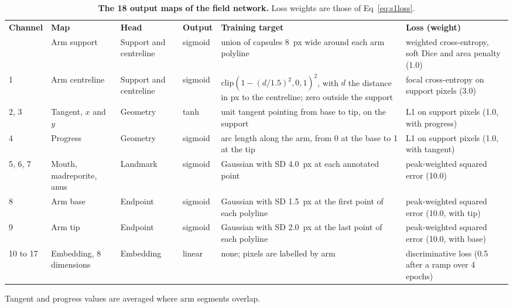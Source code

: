 \begin{table}[!htbp]
\centering
\caption{\textbf{The 18 output maps of the field network.} Loss weights are those of Eq~\ref{eq:s1loss}.}
\label{tab:fields}
{\footnotesize
\setlength{\tabcolsep}{3.5pt}
\begin{tabular}{|l|>{\raggedright\arraybackslash}p{0.9in}|>{\raggedright\arraybackslash}p{0.75in}|l|>{\raggedright\arraybackslash}p{2.0in}|>{\raggedright\arraybackslash}p{1.25in}|}
\hline
\textbf{Channel} & \textbf{Map} & \textbf{Head} & \textbf{Output} & \textbf{Training target} & \textbf{Loss (weight)} \\ \thickhline
0 & Arm support & Support and centreline & sigmoid & union of capsules 8~px wide around each arm polyline & weighted cross-entropy, soft Dice and area penalty (1.0) \\ \hline
1 & Arm centreline & Support and centreline & sigmoid & $\mathrm{clip}(1 - (d/1.5)^2, 0, 1)^2$, with $d$ the distance in px to the centreline; zero outside the support & focal cross-entropy on support pixels (3.0) \\ \hline
2, 3 & Tangent, $x$ and $y$ & Geometry & tanh & unit tangent pointing from base to tip, on the support & L1 on support pixels (1.0, with progress) \\ \hline
4 & Progress & Geometry & sigmoid & arc length along the arm, from 0 at the base to 1 at the tip & L1 on support pixels (1.0, with tangent) \\ \hline
5, 6, 7 & Mouth, madreporite, anus & Landmark & sigmoid & Gaussian with SD 4.0~px at each annotated point & peak-weighted squared error (10.0) \\ \hline
8 & Arm base & Endpoint & sigmoid & Gaussian with SD 1.5~px at the first point of each polyline & peak-weighted squared error (10.0, with tip) \\ \hline
9 & Arm tip & Endpoint & sigmoid & Gaussian with SD 2.0~px at the last point of each polyline & peak-weighted squared error (10.0, with base) \\ \hline
10 to 17 & Embedding, 8 dimensions & Embedding & linear & none; pixels are labelled by arm & discriminative loss (0.5 after a ramp over 4 epochs) \\ \hline
\end{tabular}
}
\begin{flushleft}\small
Tangent and progress values are averaged where arm segments overlap.
\end{flushleft}
\end{table}

